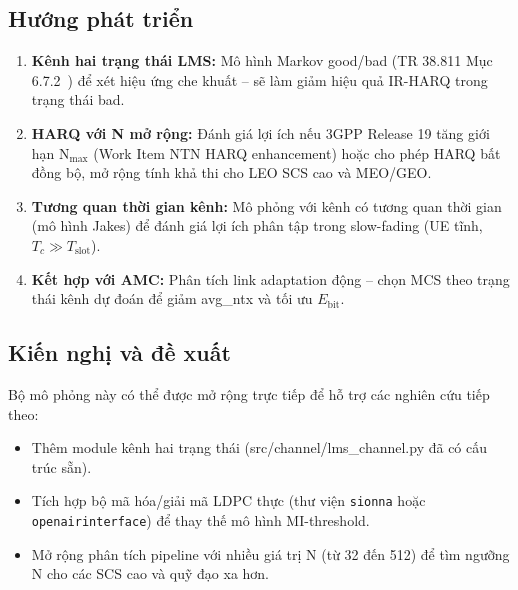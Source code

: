 \subsection*{Hướng phát triển}

\begin{enumerate}
    \item \textbf{Kênh hai trạng thái LMS:} Mô hình Markov good/bad (TR 38.811 Mục 6.7.2~\cite{tr38811}) để xét hiệu ứng che khuất -- sẽ làm giảm hiệu quả IR-HARQ trong trạng thái bad.
    \item \textbf{HARQ với N mở rộng:} Đánh giá lợi ích nếu 3GPP Release 19 tăng giới hạn N$_{\max}$ (Work Item NTN HARQ enhancement) hoặc cho phép HARQ bất đồng bộ, mở rộng tính khả thi cho LEO SCS cao và MEO/GEO.
    \item \textbf{Tương quan thời gian kênh:} Mô phỏng với kênh có tương quan thời gian (mô hình Jakes) để đánh giá lợi ích phân tập trong slow-fading (UE tĩnh, $T_c \gg T_{\text{slot}}$).
    \item \textbf{Kết hợp với AMC:} Phân tích link adaptation động -- chọn MCS theo trạng thái kênh dự đoán để giảm avg\_ntx và tối ưu $E_{\text{bit}}$.
\end{enumerate}

\subsection*{Kiến nghị và đề xuất}

Bộ mô phỏng này có thể được mở rộng trực tiếp để hỗ trợ các nghiên cứu tiếp theo:
\begin{itemize}
    \item Thêm module kênh hai trạng thái (src/channel/lms\_channel.py đã có cấu trúc sẵn).
    \item Tích hợp bộ mã hóa/giải mã LDPC thực (thư viện \texttt{sionna} hoặc \texttt{openairinterface}) để thay thế mô hình MI-threshold.
    \item Mở rộng phân tích pipeline với nhiều giá trị N (từ 32 đến 512) để tìm ngưỡng N cho các SCS cao và quỹ đạo xa hơn.
\end{itemize}
